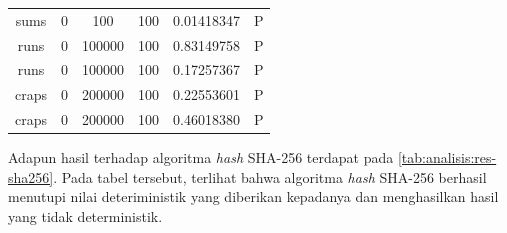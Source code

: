 \documentclass[conference]{IEEEtran}
\newcommand{\en}[1]
    {\foreignlanguage{english}{\textit{#1}}}
\begin{document}
\begin{table}[htbp]
\begin{center}
\begin{tabular}{|c|c|c|c|c|c|}
            sums           & 0            & 100          & 100          & 0.01418347            & P              \\
            runs           & 0            & 100000       & 100          & 0.83149758            & P              \\
            runs           & 0            & 100000       & 100          & 0.17257367            & P              \\
            craps          & 0            & 200000       & 100          & 0.22553601            & P              \\
            craps          & 0            & 200000       & 100          & 0.46018380            & P              \\
            \hline
        \end{tabular}
    \end{center}
\end{table}

Adapun hasil  terhadap algoritma \en{hash} SHA-256 terdapat pada \autoref{tab:analisis:res-sha256}.
Pada tabel tersebut, terlihat bahwa algoritma \en{hash} SHA-256 berhasil menutupi nilai deteriministik yang diberikan kepadanya dan menghasilkan hasil yang tidak deterministik.
\end{document}
